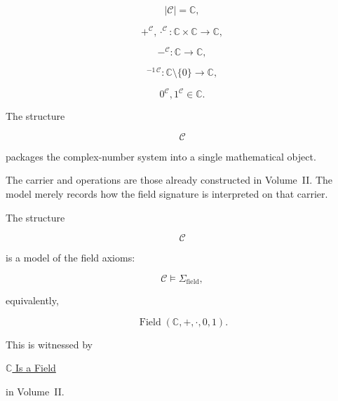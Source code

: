 
\begin{remark*}

\[
|\mathcal C|
=
\mathbb C,
\]

\[
+^{\mathcal C},
\cdot^{\mathcal C}
:
\mathbb C\times\mathbb C
\to
\mathbb C,
\]

\[
-^{\mathcal C}
:
\mathbb C
\to
\mathbb C,
\]

\[
{}^{-1\,\mathcal C}
:
\mathbb C\setminus\{0\}
\to
\mathbb C,
\]

\[
0^{\mathcal C},
1^{\mathcal C}
\in
\mathbb C.
\]

\end{remark*}


\begin{remark*}[Interpretation]

The structure

\[
\mathcal C
\]

packages the complex-number system into a single mathematical object.

The carrier and operations are those already constructed in Volume~II. The
model merely records how the field signature is interpreted on that carrier.

\end{remark*}


\begin{remark*}[Satisfaction]

The structure

\[
\mathcal C
\]

is a model of the field axioms:

\[
\mathcal C
\models
\Sigma_{\mathrm{field}},
\]

equivalently,

\[
\operatorname{Field}
(\mathbb C,+,\cdot,0,1).
\]

This is witnessed by

\hyperref[thm:c-is-field]
{$\mathbb C$ Is a Field}

in Volume~II.

\end{remark*}

